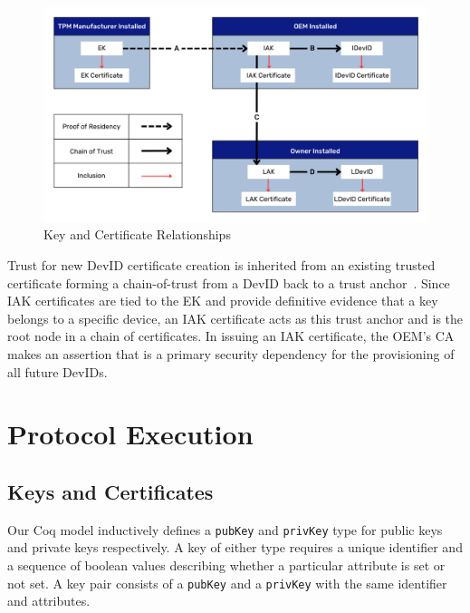 \documentclass[runningheads]{llncs}
\begin{document}
\begin{figure}[htbp]
  \begin{centering}
  \includegraphics[width=\linewidth]{figures/certRelationships.png}
  \par\end{centering}
  \caption{Key and Certificate Relationships \citep{DevIDSpec-TCG}}
  \label{fig:cert_rel}
\end{figure}

Trust for new DevID certificate creation is inherited from an existing
trusted certificate forming a chain-of-trust from a DevID back to a
trust anchor~\citep{DevIDSpec-TCG}. Since IAK certificates are tied to
the EK and provide definitive evidence that a key belongs to a
specific device, an IAK certificate acts as this trust anchor and is
the root node in a chain of certificates. In issuing an IAK
certificate, the OEM's CA makes an assertion that is a primary
security dependency for the provisioning of all future DevIDs.


\section{Protocol Execution}

\subsection{Keys and Certificates}

Our Coq model inductively defines a \verb|pubKey| and \verb|privKey|
type for public keys and private keys respectively. A key of either
type requires a unique identifier and a sequence of boolean values
describing whether a particular attribute is set or not set. A key
pair consists of a \verb|pubKey| and a \verb|privKey| with the same
identifier and attributes.
\end{document}
